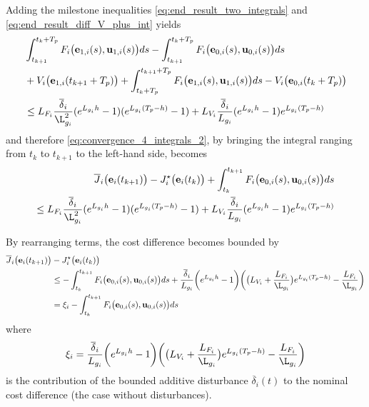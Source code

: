 Adding the milestone inequalities \eqref{eq:end_result_two_integrals} and
\eqref{eq:end_result_diff_V_plus_int} yields
\begin{alignat}{2}
  &\int_{t_{k+1}}^{t_k + T_p} F_i \big(\vect{e}_{1,i}(s), \vect{u}_{1,i} (s)\big) d s
  - \int_{t_{k+1}}^{t_k + T_p} F_i \big(\vect{e}_{0,i}(s), \vect{u}_{0,i} (s)\big) d s \\
  &+ V_i\big(\vect{e}_{1,i}(t_{k+1} + T_p)\big)
  + \int_{t_k + T_p}^{t_{k+1} + T_p} F_i\big(\vect{e}_{1,i}(s), \vect{u}_{1,i}(s)\big) ds
  - V_i\big(\vect{e}_{0,i}(t_k + T_p)\big) \\
  &\leq L_{F_i} \dfrac{\overline{\delta}_i}{\L_{g_i}^2} (e^{L_{g_i} h} - 1) (e^{L_{g_i}(T_p-h)} - 1)
  + L_{V_i}\dfrac{\overline{\delta}_i}{L_{g_i}} (e^{L_{g_i}h} - 1) e^{L_{g_i} (T_p - h)}
\end{alignat}
and therefore \eqref{eq:convergence_4_integrals_2}, by bringing the integral
ranging from $t_k$ to $t_{k+1}$ to the left-hand side, becomes
\begin{align}
  \overline{J}_i\big(\vect{e}_i(t_{k+1})\big)
    - J_i^{\star}\big(\vect{e}_i(t_k)\big)
    + \int_{t_k}^{t_{k+1}} F_i \big(\vect{e}_{0,i}(s), \vect{u}_{0,i} (s)\big) d s \\
    \leq L_{F_i} \dfrac{\overline{\delta}_i}{\L_{g_i}^2} (e^{L_{g_i} h} - 1) (e^{L_{g_i}(T_p-h)} - 1)
  + L_{V_i}\dfrac{\overline{\delta}_i}{L_{g_i}} (e^{L_{g_i}h} - 1) e^{L_{g_i} (T_p - h)}
\end{align}

By rearranging terms, the cost difference becomes bounded by
\begin{align}
  \overline{J}_i\big(\vect{e}_i(t_{k+1})\big) &- J_i^{\star}\big(\vect{e}_i(t_k)\big) \\
  &\leq -\int_{t_k}^{t_{k+1}} F_i \big(\vect{e}_{0,i}(s), \vect{u}_{0,i} (s)\big) d s
    + \dfrac{\overline{\delta}_i}{L_{g_i}} \bigg(e^{L_{g_i}h} - 1\bigg)
    \bigg(\big(L_{V_i} + \dfrac{L_{F_i}}{\L_{g_i}}\big) e^{L_{g_i}(T_p-h)}  - \dfrac{L_{F_i}}{\L_{g_i}}\bigg) \\
  &= \xi_i -\int_{t_k}^{t_{k+1}} F_i \big(\vect{e}_{0,i}(s), \vect{u}_{0,i} (s)\big) d s
\end{align}
where
\begin{align}
  \xi_i = \dfrac{\overline{\delta}_i}{L_{g_i}} \bigg(e^{L_{g_i}h} - 1\bigg)
    \bigg(\big(L_{V_i} + \dfrac{L_{F_i}}{\L_{g_i}}\big) e^{L_{g_i}(T_p-h)}  - \dfrac{L_{F_i}}{\L_{g_i}}\bigg)
\end{align}
is the contribution of the bounded additive disturbance $\overline{\delta}_i(t)$
to the nominal cost difference (the case without disturbances).

